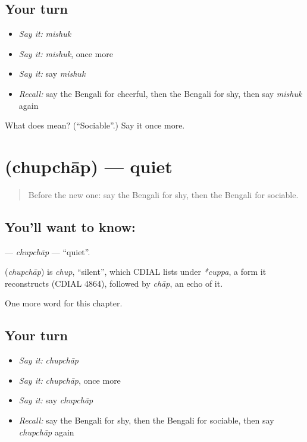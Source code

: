 \subsection*{Your turn}
\begin{itemize}
\raggedright
  \item \emph{Say it:} \emph{mishuk}
  \item \emph{Say it:} \emph{mishuk}, once more
  \item \emph{Say it:} say \emph{mishuk}
  \item \emph{Recall:} say the Bengali for cheerful, then the Bengali for shy, then say \emph{mishuk} again
\end{itemize}

\begin{tcolorbox}[breakable,colback=teal!4,colframe=teal!35!black,title={Before you move on}]
What does  mean? (\textquotedblleft{}Sociable\textquotedblright{}.) Say it once more.
\end{tcolorbox}
\section[\texorpdfstring{\bn{চুপচাপ} (chupchāp)}{চুপচাপ (chupchāp)}]{ (chupchāp) — quiet}

\label{lesson:BN-C144-chupchap}



\begin{quote}
Before the new one: say the Bengali for shy, then the Bengali for sociable.
\end{quote}

\subsection*{You'll want to know: }
\textbf{} — \emph{chupchāp} — \textquotedblleft{}quiet\textquotedblright{}.

\begin{cousinweb}
\textbf{} (\emph{chupchāp}) is \emph{chup}, \textquotedblleft{}silent\textquotedblright{}, which CDIAL lists under \emph{*cuppa}, a form it reconstructs (CDIAL 4864), followed by \emph{chāp}, an echo of it.
\end{cousinweb}

\begin{grammarlens}[title={What you've built}]
One more word for this chapter.
\end{grammarlens}

\subsection*{Your turn}
\begin{itemize}
\raggedright
  \item \emph{Say it:} \emph{chupchāp}
  \item \emph{Say it:} \emph{chupchāp}, once more
  \item \emph{Say it:} say \emph{chupchāp}
  \item \emph{Recall:} say the Bengali for shy, then the Bengali for sociable, then say \emph{chupchāp} again
\end{itemize}

